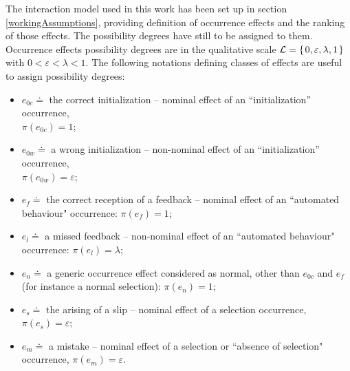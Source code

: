 The interaction model used in this work has
been set up in section \ref{workingAssumptions}, 
providing definition of occurrence effects 
and the ranking of those effects.  
The possibility degrees have still to be assigned
to them.
Occurrence effects possibility degrees are  
in the qualitative scale $\mathcal{L}=\left\{ \left. 0,\varepsilon,\lambda,1 \right. \right\}$ 
with $0<\varepsilon<\lambda<1$.
The following notations defining classes of effects are useful 
to assign possibility degrees:
\begin{itemize}
\item $e_{0c} \doteq$ the correct initialization -- nominal effect of an ``initialization'' occurrence,\\ $\pi(e_{0c})=1$;
\item $e_{0w} \doteq$ a wrong initialization -- non-nominal effect of an ``initialization'' occurrence,\\ $\pi(e_{0w})=\varepsilon$;
\item $e_f \doteq$ the correct reception of a feedback -- nominal effect of an ``automated behaviour" occurrence: $\pi(e_f)=1$;
\item $e_l \doteq$ a missed feedback -- non-nominal effect of an ``automated behaviour" occurrence: $\pi(e_l)=\lambda$;
\item $e_{n} \doteq$ a generic occurrence effect considered as normal, other than $e_{0c}$ and $e_f$ (for instance a normal selection): $\pi(e_{n})=1$;
\item $e_s \doteq$ the arising of a slip -- nominal effect of a selection occurrence, $\pi(e_s) = \varepsilon$;
\item $e_m \doteq$ a mistake -- nominal effect of a selection or ``absence of selection" occurrence, $\pi(e_m) = \varepsilon$.
\end{itemize}
%  
